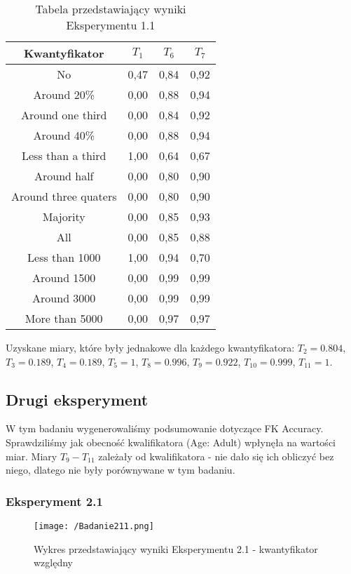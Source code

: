 \documentclass{classrep}
\begin{document}
\begin{table}[H]
	\centering
	\begin{tabular}{c c c c} 
		\hline
		\textbf{Kwantyfikator} & \textbf{$T_1$} & \textbf{$T_6$} & \textbf{$T_7$}\\ [0.5ex] 
		\hline
		\hline 
        No & 0,47 & 0,84 & 0,92\\
        Around 20\% & 0,00 & 0,88 & 0,94\\
        Around one third & 0,00 & 0,84 & 0,92\\
        Around 40\% & 0,00 & 0,88 & 0,94\\
        Less than a third & 1,00 & 0,64 & 0,67\\
        Around half & 0,00 & 0,80 & 0,90\\
        Around three quaters & 0,00 & 0,80 & 0,90\\
        Majority & 0,00 & 0,85 & 0,93\\
        All & 0,00 & 0,85 & 0,88\\
        Less than 1000 & 1,00 & 0,94 & 0,70\\
        Around 1500 & 0,00 & 0,99 & 0,99\\
        Around 3000 & 0,00 & 0,99 & 0,99\\
        More than 5000 & 0,00 & 0,97 & 0,97\\
        \hline
	\end{tabular}
	\caption{Tabela przedstawiający wyniki Eksperymentu 1.1}
\end{table}

Uzyskane miary, które były jednakowe dla każdego kwantyfikatora: $T_2 = 0.804$, $T_3 = 0.189$, $T_4 = 0.189$, $T_5 = 1$, $T_8 = 0.996$, $T_9 = 0.922$, $T_{10} = 0.999$, $T_{11} = 1$.

\subsection{Drugi eksperyment}
W tym badaniu wygenerowaliśmy podsumowanie dotyczące FK Accuracy. Sprawdziliśmy jak obecność kwalifikatora (Age: Adult) wpłynęła na wartości miar.
Miary $T_9-T_{11}$ zależały od kwalifikatora - nie dało się ich obliczyć bez niego, dlatego nie były porównywane w tym badaniu.
\subsubsection{Eksperyment 2.1}
\begin{figure}[H]
	\centering
	\texttt{[image: /Badanie211.png]}
	\caption{Wykres przedstawiający wyniki Eksperymentu 2.1 - kwantyfikator względny}
\end{figure}
\end{document}
